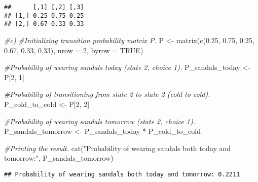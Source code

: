 \documentclass[
]{article}
\newenvironment{Shaded}{\begin{snugshade}}{\end{snugshade}}
\newcommand{\AttributeTok}[1]{\textcolor[rgb]{0.77,0.63,0.00}{#1}}
\newcommand{\CommentTok}[1]{\textcolor[rgb]{0.56,0.35,0.01}{\textit{#1}}}
\newcommand{\ConstantTok}[1]{\textcolor[rgb]{0.00,0.00,0.00}{#1}}
\newcommand{\DecValTok}[1]{\textcolor[rgb]{0.00,0.00,0.81}{#1}}
\newcommand{\FloatTok}[1]{\textcolor[rgb]{0.00,0.00,0.81}{#1}}
\newcommand{\FunctionTok}[1]{\textcolor[rgb]{0.00,0.00,0.00}{#1}}
\newcommand{\NormalTok}[1]{#1}
\newcommand{\OtherTok}[1]{\textcolor[rgb]{0.56,0.35,0.01}{#1}}
\newcommand{\SpecialCharTok}[1]{\textcolor[rgb]{0.00,0.00,0.00}{#1}}
\newcommand{\StringTok}[1]{\textcolor[rgb]{0.31,0.60,0.02}{#1}}
\begin{document}
\begin{verbatim}
##      [,1] [,2] [,3]
## [1,] 0.25 0.75 0.25
## [2,] 0.67 0.33 0.33
\end{verbatim}

\begin{Shaded}
\begin{Highlighting}[]
\CommentTok{\#c) }
\CommentTok{\#Initializing transition probability matrix P.}
\NormalTok{P }\OtherTok{\textless{}{-}} \FunctionTok{matrix}\NormalTok{(}\FunctionTok{c}\NormalTok{(}\FloatTok{0.25}\NormalTok{, }\FloatTok{0.75}\NormalTok{, }\FloatTok{0.25}\NormalTok{, }\FloatTok{0.67}\NormalTok{, }\FloatTok{0.33}\NormalTok{, }\FloatTok{0.33}\NormalTok{), }\AttributeTok{nrow =} \DecValTok{2}\NormalTok{, }\AttributeTok{byrow =} \ConstantTok{TRUE}\NormalTok{)}

\CommentTok{\#Probability of wearing sandals today (state 2, choice 1).}
\NormalTok{P\_sandals\_today }\OtherTok{\textless{}{-}}\NormalTok{ P[}\DecValTok{2}\NormalTok{, }\DecValTok{1}\NormalTok{]}

\CommentTok{\#Probability of transitioning from state 2 to state 2 (cold to cold).}
\NormalTok{P\_cold\_to\_cold }\OtherTok{\textless{}{-}}\NormalTok{ P[}\DecValTok{2}\NormalTok{, }\DecValTok{2}\NormalTok{]}

\CommentTok{\#Probability of wearing sandals tomorrow (state 2, choice 1).}
\NormalTok{P\_sandals\_tomorrow }\OtherTok{\textless{}{-}}\NormalTok{ P\_sandals\_today }\SpecialCharTok{*}\NormalTok{ P\_cold\_to\_cold}

\CommentTok{\#Printing the result.}
\FunctionTok{cat}\NormalTok{(}\StringTok{"Probability of wearing sandals both today and tomorrow:"}\NormalTok{, P\_sandals\_tomorrow)}
\end{Highlighting}
\end{Shaded}

\begin{verbatim}
## Probability of wearing sandals both today and tomorrow: 0.2211
\end{verbatim}
\end{document}

